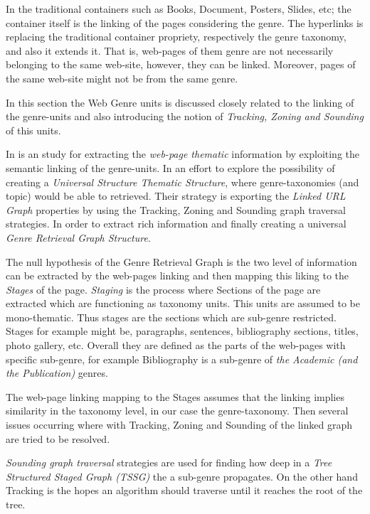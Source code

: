 In the  traditional containers such as Books, Document, Posters, Slides, etc; the container itself is the linking of the pages considering the genre. The hyperlinks is replacing the traditional container propriety, respectively the genre taxonomy, and also it extends it. That is, web-pages of them genre are not necessarily belonging to the same web-site, however, they can be linked. Moreover, pages of the same web-site might not be from the same genre. 

In this section the Web Genre units is discussed closely related to the linking of the genre-units and also introducing the notion of \textit{Tracking, Zoning and Sounding} of this units. 

In \parencite{mehler2011integrating} is an study for extracting the \textit{web-page thematic} information by exploiting the semantic linking of the genre-units. In an effort to explore the possibility of creating a \textit{Universal Structure Thematic Structure}, where genre-taxonomies (and topic) would be able to retrieved. Their strategy is exporting the \textit{Linked URL Graph} properties by using the Tracking, Zoning and Sounding graph traversal strategies. In order to extract rich information and finally creating a universal \textit{Genre Retrieval Graph Structure}.

The null hypothesis of the Genre Retrieval Graph is the two level of information can be extracted by the web-pages linking and then mapping this liking to the \textit{Stages} of the page. \textit{Staging} is the process where Sections of the page are extracted which are functioning as taxonomy units. This units are assumed to be mono-thematic. Thus stages are the sections which are sub-genre restricted. Stages for example might be, paragraphs, sentences, bibliography sections, titles, photo gallery, etc. Overall they are defined as the parts of the web-pages with specific sub-genre, for example Bibliography is a sub-genre of \textit{the Academic (and the Publication)} genres.

The web-page linking mapping to the Stages assumes that the linking implies similarity in the taxonomy level, in our case the genre-taxonomy. Then several issues occurring where with Tracking, Zoning and Sounding of the linked graph are tried to be resolved.

\textit{Sounding graph traversal} strategies are used for finding how deep in a \textit{Tree Structured Staged Graph (TSSG)}  the a sub-genre propagates. On the other hand Tracking is the hopes an algorithm should traverse until it reaches the root of the tree.

